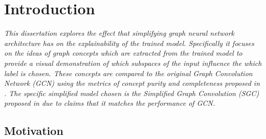 \chapter{Introduction}


\emph{
This dissertation explores the effect that simplifying graph neural network architecture has on the explainability of the trained model.
Specifically it focuses on the ideas of graph concepts which are extracted from the trained model to provide a visual demonstration of which subspaces of the input influence the which label is chosen.
These concepts are compared to the original Graph Convolution Network (GCN) using the metrics of concept purity and completeness proposed in \cite{magister2021gcexplainer}.
The specific simplified model chosen is the Simplified Graph Convolution (SGC) proposed in \cite{wu2019simplifying} due to claims that it matches the performance of GCN.
}

\section{Motivation}













